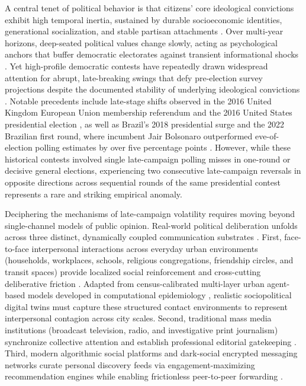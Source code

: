 \documentclass[11pt,a4paper]{article}
\begin{document}
A central tenet of political behavior is that citizens' core ideological convictions exhibit high temporal inertia, sustained by durable socioeconomic identities, generational socialization, and stable partisan attachments \citep{converse1964nature, alwin1991aging, zaller1992nature}. Over multi-year horizons, deep-seated political values change slowly, acting as psychological anchors that buffer democratic electorates against transient informational shocks \citep{kiley2020measuring, howe2017attitude}. Yet high-profile democratic contests have repeatedly drawn widespread attention for abrupt, late-breaking swings that defy pre-election survey projections despite the documented stability of underlying ideological convictions \citep{tucker2018social, lorenz2019accelerating, jennings2018election}. Notable precedents include late-stage shifts observed in the 2016 United Kingdom European Union membership referendum and the 2016 United States presidential election \citep{kennedy2018evaluation, jennings2018election}, as well as Brazil's 2018 presidential surge \citep{nicolau2020brasil} and the 2022 Brazilian first round, where incumbent Jair Bolsonaro outperformed eve-of-election polling estimates by over five percentage points \citep{tse2022resultados}. However, while these historical contests involved single late-campaign polling misses in one-round or decisive general elections, experiencing two consecutive late-campaign reversals in opposite directions across sequential rounds of the same presidential contest represents a rare and striking empirical anomaly.

Deciphering the mechanisms of late-campaign volatility requires moving beyond single-channel models of public opinion. Real-world political deliberation unfolds across three distinct, dynamically coupled communication substrates \citep{boccaletti2014structure, kivela2014multilayer}. First, face-to-face interpersonal interactions across everyday urban environments (households, workplaces, schools, religious congregations, friendship circles, and transit spaces) provide localized social reinforcement and cross-cutting deliberative friction \citep{granovetter1973strength, mcpherson2001birds}. Adapted from census-calibrated multi-layer urban agent-based models developed in computational epidemiology \citep{lopes2022measuring}, realistic sociopolitical digital twins must capture these structured contact environments to represent interpersonal contagion across city scales. Second, traditional mass media institutions (broadcast television, radio, and investigative print journalism) synchronize collective attention and establish professional editorial gatekeeping \citep{mccombs1972agenda, gentzkow2006media}. Third, modern algorithmic social platforms and dark-social encrypted messaging networks curate personal discovery feeds via engagement-maximizing recommendation engines while enabling frictionless peer-to-peer forwarding \citep{cinelli2021echo, vosoughi2018spread, cesarino2020posverdade}. 
\end{document}
